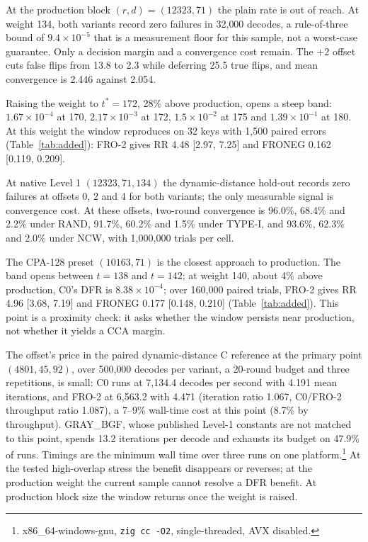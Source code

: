 \documentclass[letterpaper,journal]{IEEEtran}
\begin{document}
At the production block $(r,d)=(12323,71)$ the plain rate is out of reach. At weight 134, both variants record zero failures in 32{,}000 decodes, a rule-of-three bound of $9.4\times10^{-5}$ that is a measurement floor for this sample, not a worst-case guarantee. Only a decision margin and a convergence cost remain. The $+2$ offset cuts false flips from 13.8 to 2.3 while deferring 25.5 true flips, and mean convergence is 2.446 against 2.054.\label{sec:production}

Raising the weight to $t^\ast=172$, 28\% above production, opens a steep band: $1.67\times10^{-4}$ at 170, $2.17\times10^{-3}$ at 172, $1.5\times10^{-2}$ at 175 and $1.39\times10^{-1}$ at 180. At this weight the window reproduces on 32 keys with 1{,}500 paired errors (Table~\ref{tab:added}): FRO-2 gives RR 4.48 [2.97, 7.25] and FRONEG 0.162 [0.119, 0.209].

At native Level 1 $(12323,71,134)$ the dynamic-distance hold-out records zero failures at offsets 0, 2 and 4 for both variants; the only measurable signal is convergence cost. At these offsets, two-round convergence is 96.0\%, 68.4\% and 2.2\% under RAND, 91.7\%, 60.2\% and 1.5\% under TYPE-I, and 93.6\%, 62.3\% and 2.0\% under NCW, with 1{,}000{,}000 trials per cell.

The CPA-128 preset $(10163,71)$ is the closest approach to production. The band opens between $t=138$ and $t=142$; at weight 140, about 4\% above production, C0's DFR is $8.38\times10^{-4}$; over 160{,}000 paired trials, FRO-2 gives RR 4.96 [3.68, 7.19] and FRONEG 0.177 [0.148, 0.210] (Table~\ref{tab:added}). This point is a proximity check: it asks whether the window persists near production, not whether it yields a CCA margin.

The offset's price in the paired dynamic-distance C reference at the primary point $(4801,45,92)$, over 500{,}000 decodes per variant, a 20-round budget and three repetitions, is small: C0 runs at 7{,}134.4 decodes per second with 4.191 mean iterations, and FRO-2 at 6{,}563.2 with 4.471 (iteration ratio 1.067, C0/FRO-2 throughput ratio 1.087), a 7--9\% wall-time cost at this point (8.7\% by throughput). GRAY\_BGF, whose published Level-1 constants are not matched to this point, spends 13.2 iterations per decode and exhausts its budget on 47.9\% of runs. Timings are the minimum wall time over three runs on one platform.\footnote{x86\_64-windows-gnu, \texttt{zig cc -O2}, single-threaded, AVX disabled.} At the tested high-overlap stress the benefit disappears or reverses; at the production weight the current sample cannot resolve a DFR benefit. At production block size the window returns once the weight is raised.
\end{document}
